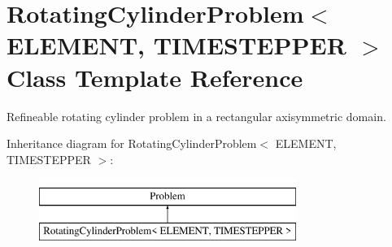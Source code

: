 \hypertarget{classRotatingCylinderProblem}{}\section{Rotating\+Cylinder\+Problem$<$ E\+L\+E\+M\+E\+NT, T\+I\+M\+E\+S\+T\+E\+P\+P\+ER $>$ Class Template Reference}
\label{classRotatingCylinderProblem}


Refineable rotating cylinder problem in a rectangular axisymmetric domain.  


Inheritance diagram for Rotating\+Cylinder\+Problem$<$ E\+L\+E\+M\+E\+NT, T\+I\+M\+E\+S\+T\+E\+P\+P\+ER $>$\+:\begin{figure}[H]
\begin{center}
\leavevmode
\includegraphics[height=2.000000cm]{classRotatingCylinderProblem}
\end{center}
\end{figure}
